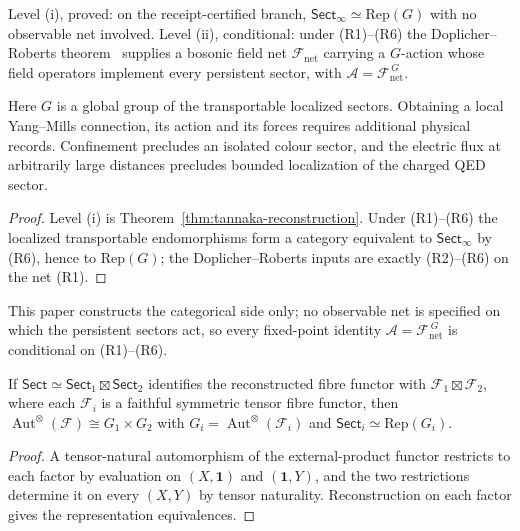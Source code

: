 \documentclass[11pt]{article}
\begin{document}
\begin{corollary}
Level (i), proved: on the receipt-certified branch,
\(\mathsf{Sect}_\infty\simeq\mathrm{Rep}(G)\) with no observable net
involved. Level (ii), conditional: under (R1)--(R6) the
Doplicher--Roberts theorem~\cite{dr89,dr90} supplies a bosonic field net
\(\mathcal F_{\mathrm{net}}\) carrying a \(G\)-action whose field operators
implement every persistent sector, with
\(\mathcal A=\mathcal F_{\mathrm{net}}^{\,G}\).
\end{corollary}

Here $G$ is a global group of the transportable localized sectors. Obtaining a
local Yang--Mills connection, its action and its forces requires
additional physical records. Confinement precludes an isolated colour
sector, and the electric flux at arbitrarily large distances precludes
bounded localization of the charged QED sector.

\begin{proof}
Level (i) is Theorem~\ref{thm:tannaka-reconstruction}. Under (R1)--(R6) the
localized transportable endomorphisms form a category equivalent to
\(\mathsf{Sect}_\infty\) by (R6), hence to \(\mathrm{Rep}(G)\); the
Doplicher--Roberts inputs are exactly (R2)--(R6) on the net (R1).
\end{proof}

This paper constructs the categorical side only; no observable net is
specified on which the persistent sectors act, so every fixed-point identity
\(\mathcal A=\mathcal F_{\mathrm{net}}^{\,G}\) is conditional on (R1)--(R6).

\begin{lemma}
\label{lem:product-factorization}
If \(\mathsf{Sect}\simeq\mathsf{Sect}_1\boxtimes\mathsf{Sect}_2\) identifies
the reconstructed fibre functor with \(\mathcal F_1\boxtimes\mathcal F_2\),
where each \(\mathcal F_i\) is a faithful symmetric tensor fibre functor, then
\(\operatorname{Aut}^{\otimes}(\mathcal F)\cong G_1\times G_2\) with
\(G_i=\operatorname{Aut}^{\otimes}(\mathcal F_i)\) and
\(\mathsf{Sect}_i\simeq\mathrm{Rep}(G_i)\).
\end{lemma}

\begin{proof}
A tensor-natural automorphism of the external-product functor restricts to
each factor by evaluation on \((X,\mathbf 1)\) and \((\mathbf 1,Y)\), and the
two restrictions determine it on every \((X,Y)\) by tensor naturality.
Reconstruction on each factor gives the representation equivalences.
\end{proof}
\end{document}
